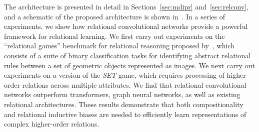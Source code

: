 The architecture is presented in detail in Sections~\ref{sec:mdipr} and~\ref{sec:relconv}, and a schematic of the proposed architecture is shown in~. In a series of experiments, we show how relational convolutional networks provide a powerful framework
for relational learning. We first carry out experiments on the ``relational games'' benchmark for relational reasoning proposed by~\citet{shanahanExplicitlyRelationalNeural}, which consists of a suite of binary classification tasks for identifying abstract relational rules between a set of geometric objects represented as images. 
We next carry out experiments on a version of the \textit{SET} game, which requires processing of higher-order relations across multiple attributes. We find that relational convolutional networks outperform transformers, graph neural networks, as well as existing relational architectures. These results demonstrate that both compositionality and relational inductive biases are needed to efficiently learn representations of complex higher-order relations.


